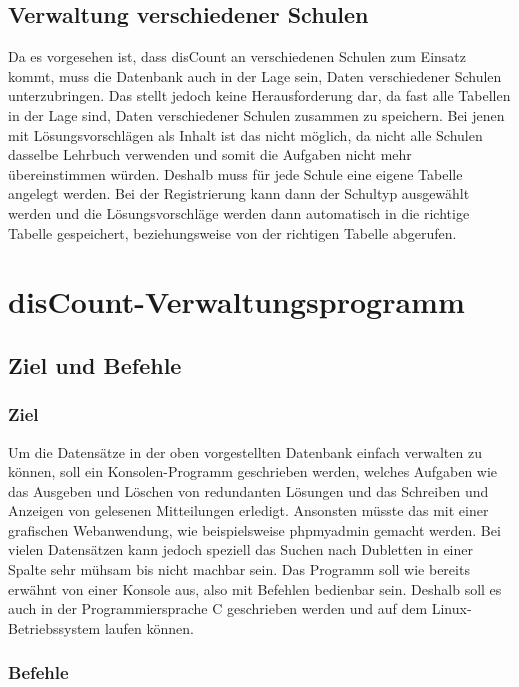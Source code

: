 \documentclass[12pt]{report}
\begin{document}
\chapter{Verwaltung verschiedener Schulen}
Da es vorgesehen ist, dass disCount an verschiedenen Schulen zum Einsatz kommt, muss die Datenbank auch in der Lage sein, Daten verschiedener Schulen unterzubringen. Das stellt jedoch keine Herausforderung dar, da fast alle Tabellen in der Lage sind, Daten verschiedener Schulen zusammen zu speichern. Bei jenen mit Lösungsvorschlägen als Inhalt ist das nicht möglich, da nicht alle Schulen dasselbe Lehrbuch verwenden und somit die Aufgaben nicht mehr übereinstimmen würden. Deshalb muss für jede Schule eine eigene Tabelle angelegt werden. Bei der Registrierung kann dann der Schultyp ausgewählt werden und die Lösungsvorschläge werden dann automatisch in die richtige Tabelle gespeichert, beziehungsweise von der richtigen Tabelle abgerufen.
  

\part{disCount-Verwaltungsprogramm}

\chapter{Ziel und Befehle}
\lhead{\thepage}

\section{Ziel}
Um die Datensätze in der oben vorgestellten Datenbank einfach verwalten zu können, soll ein Konsolen-Programm geschrieben werden, welches Aufgaben wie das Ausgeben und Löschen von redundanten Lösungen und das Schreiben und Anzeigen von gelesenen Mitteilungen erledigt. Ansonsten müsste das mit einer grafischen Webanwendung, wie beispielsweise phpmyadmin gemacht werden. Bei vielen Datensätzen kann jedoch speziell das Suchen nach Dubletten in einer Spalte sehr mühsam bis nicht machbar sein. Das Programm soll wie bereits erwähnt von einer Konsole aus, also mit Befehlen bedienbar sein. Deshalb soll es auch in der Programmiersprache C geschrieben werden und auf dem Linux-Betriebssystem laufen können.

\section{Befehle}
\end{document}
